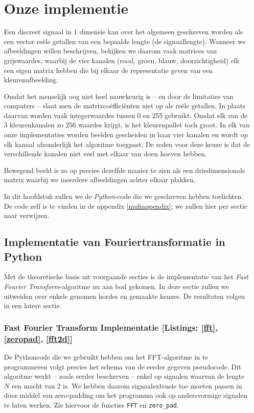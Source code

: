\chapter{Onze implementie}
\label{implementatieH}
Een discreet signaal in 1 dimensie kan over het algemeen geschreven worden als een vector re\"ele getallen van een bepaalde lengte (de signaallengte). Wanneer we afbeeldingen willen beschrijven, bekijken we daarom vaak matrices van grijswaardes, waarbij de vier kanalen (rood, groen, blauw, doorzichtigheid) elk een eigen matrix hebben die bij elkaar de representatie geven van een kleurenafbeelding.

Omdat het menselijk oog niet heel nauwkeurig is -- en door de limitaties van computers -- slaat men de matrixco\"effici\"enten niet op als re\"ele getallen. In plaats daarvan worden vaak integerwaardes tussen 0 en 255 gebruikt. Omdat elk van de 3 kleurenkanalen zo 256 waardes krijgt, is het kleurenpallet toch groot. In elk van onze implementaties worden beelden gescheiden in haar vier kanalen en wordt op elk kanaal afzonderlijk het algoritme toegpast. De reden voor deze keuze is dat de verschillende kanalen niet veel met elkaar van doen hoeven hebben.

Bewegend beeld is zo op precies dezelfde manier te zien als een driedimensionale matrix waarbij we meerdere afbeeldingen achter elkaar plakken.

In dit hoofdstuk zullen we de \emph{Python}-code die we geschreven hebben toelichten. De code zelf is te vinden in de
appendix \ref{muhappendix}; we zullen hier per sectie naar verwijzen.

\section{Implementatie van Fouriertransformatie in Python}
Met de theoretische basis uit voorgaande secties is de implementatie van het 
\emph{Fast Fourier Transform}-algoritme nu aan bod gekomen. 
In deze sectie zullen we uitweiden over enkele genomen hordes en gemaakte keuzes. De resultaten volgen
in een latere sectie.

\subsection{Fast Fourier Transform Implementatie [Listings: \ref{fft}, \ref{zeropad}, \ref{fft2d}]}
De Pythoncode die we gebruikt hebben om het FFT-algoritme in te programmeren volgt precies het schema van de eerder 
gegeven pseudocode. 
Dit algoritme werkt -- zoals eerder beschreven -- enkel op signalen waarvan de lengte $N$ een macht van $2$ is. 
We hebben daarom signaalextensie toe moeten passen in  door middel van zero-padding om het programma ook op 
andersvormige signalen te laten werken. Zie hiervoor de functies \texttt{FFT} en \texttt{zero\_pad}.

